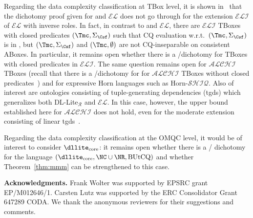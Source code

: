 \documentclass{lmcs}
\theoremstyle{definition}
\begin{document}
Regarding the data complexity classification at TBox level, it is shown 
in~\cite{Lutz:2013:ODA:2540128.2540276} that the dichotomy proof given for \dlliter and $\mathcal{EL}$ does 
not go through for the extension $\mathcal{ELI}$ of $\mathcal{EL}$ with inverse roles. In fact, in 
contrast to \dlliter and $\mathcal{EL}$, there are $\mathcal{ELI}$ TBoxes
with closed predicates $(\Tmc,\Sigma_{\Csf})$ such that CQ evaluation w.r.t.~$(\Tmc,\Sigma_{\Csf})$ is in \ptime, 
but $(\Tmc,\Sigma_{\Csf})$ and $(\Tmc,\emptyset)$ are not CQ-inseparable on consistent ABoxes.
In particular, it remains open whether there is a \ptime/\conp dichotomy for TBoxes with closed predicates
in $\mathcal{ELI}$. The same question remains open for $\mathcal{ALCHI}$ TBoxes 
(recall that there is a \ptime/\conp dichotomy for for $\mathcal{ALCHI}$ TBoxes without closed 
predicates~\cite{DBLP:journals/lmcs/LutzW17,DBLP:conf/pods/HernichLPW17}) and for expressive Horn languages
such as Horn-$\mathcal{SHIQ}$. Also of interest are ontologies consisting of tuple-generating
dependencies (tgds) which generalizes both DL-Lite$_{\mathcal{R}}$ and $\mathcal{EL}$.
In this case, however, the \conp upper bound established here for $\mathcal{ALCHI}$ does not 
hold, even for the moderate extension consisting of linear tgds~\cite{DBLP:conf/lics/BenediktBCP16,Benedikt}.
  
Regarding the data complexity classification at the OMQC level, it would be of interest to
consider $\text{\dllite}_{\text{core}}$: it remains open whether there is a \ptime/\conp
dichotomy for the language $(\text{\dllite}_{\text{core}},\NC \cup \NR,\text{BUtCQ})$
and whether Theorem~\ref{thm:mmm} can be strengthened to this case.

\bigskip
\noindent
\textbf{Acknowledgments.} Frank Wolter was supported by EPSRC grant
EP/M012646/1.  Carsten Lutz was supported by the ERC Consolidator
Grant 647289 CODA. We thank the anonymous reviewers for their suggestions and    
comments.  

%
%
\end{document}
